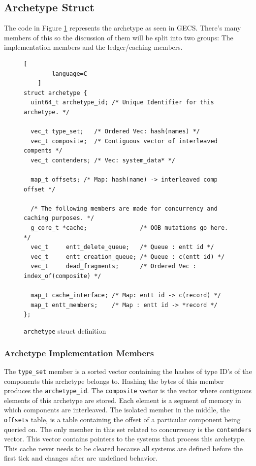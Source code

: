 \subsection{Archetype Struct}
The code in Figure \ref{code:archetype} represents the archetype as seen in GECS. There's many members of this so the discussion of them will be split into two groups: The implementation members and the ledger/caching members. 

\begin{figure}[H]
    \begin{lstlisting}[
        language=C
    ]
struct archetype {
  uint64_t archetype_id; /* Unique Identifier for this archetype. */
  
  vec_t type_set;   /* Ordered Vec: hash(names) */
  vec_t composite;  /* Contiguous vector of interleaved compents */
  vec_t contenders; /* Vec: system_data* */
  
  map_t offsets; /* Map: hash(name) -> interleaved comp offset */
  
  /* The following members are made for concurrency and caching purposes. */
  g_core_t *cache;               /* OOB mutations go here. */
  vec_t     entt_delete_queue;   /* Queue : entt id */
  vec_t     entt_creation_queue; /* Queue : c(entt id) */
  vec_t     dead_fragments;      /* Ordered Vec : index_of(composite) */
  
  map_t cache_interface; /* Map: entt id -> c(record) */
  map_t entt_members;    /* Map : entt id -> *record */
};
    \end{lstlisting}
    \caption{\texttt{archetype} struct definition}
    \label{code:archetype}
\end{figure}

\subsubsection{Archetype Implementation Members}
The \texttt{type\_set} member is a sorted vector containing the hashes of type ID's of the components this archetype belongs to. Hashing the bytes of this member produces the \texttt{archetype\_id}. The \texttt{composite} vector is the vector where contiguous elements of this archetype are stored. Each element is a segment of memory in which components are interleaved. The isolated member in the middle, the \texttt{offsets} table, is a table containing the offset of a particular component being queried on.  
The only member in this set related to concurrency is the \texttt{contenders} vector. This vector contains pointers to the systems that process this archetype. This cache never needs to be cleared because all systems are defined before the first tick and changes after are undefined behavior.


